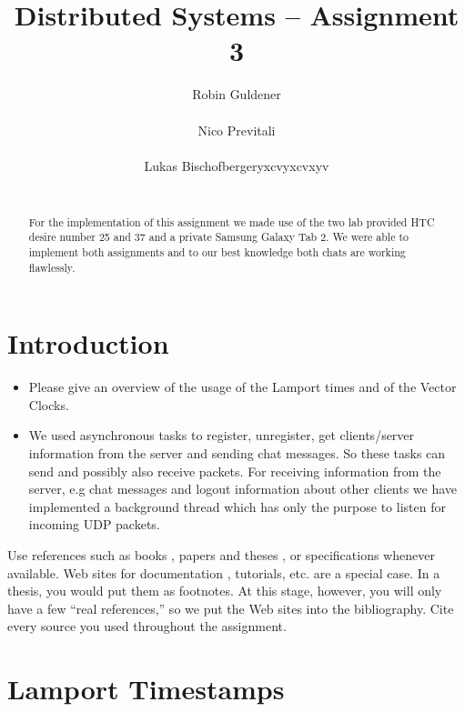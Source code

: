 \documentclass{report}
\title{Distributed Systems -- Assignment 3}
\author{
%
%
\alignauthor Robin Guldener\\
	\affaddr{ETH ID 11-930-369}\\
	\email{robing@student.ethz.ch}
\alignauthor Nico Previtali\\
	\affaddr{ETH ID 11-926-433}\\
	\email{pnico@student.ethz.ch}
\alignauthor Lukas Bischofbergeryxcvyxcvxyv\\
	\affaddr{ETH ID 11-915-907}\\
	\email{lukasbi@student.ethz.ch}
}
\begin{document}
\maketitle

\begin{abstract}
For the implementation of this assignment we made use of the two lab provided HTC desire number 25 and 37 and a private Samsung Galaxy Tab 2. We were able to implement both assignments and to our best knowledge both chats are working flawlessly. 
\end{abstract}

\section{Introduction}

\begin{itemize}
  \item Please give an overview of the usage of the Lamport times and of the Vector Clocks.
  \item %
  We used asynchronous tasks to register, unregister, get clients/server information from the server and sending chat messages. So these tasks can send and possibly also receive packets. For receiving information from the server, e.g chat messages and logout information about other clients we have implemented a background thread which has only the purpose to listen for incoming UDP packets. 
\end{itemize}

Use references such as books \cite{hello}, papers and theses \cite{REST}, or specifications \cite{RFC2616} whenever available.
Web sites for documentation \cite{devServices}, tutorials, etc. are a special case.
In a thesis, you would put them as footnotes. At this stage, however, you will only have a few ``real references,'' so we put the Web sites into the bibliography.
Cite every source you used throughout the assignment.

\section{Lamport Timestamps}
\end{document}
